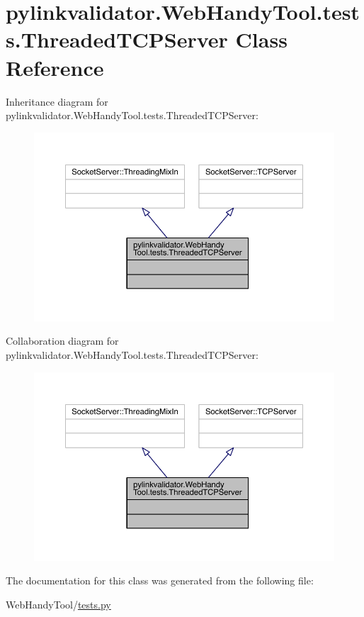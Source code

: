 \hypertarget{classpylinkvalidator_1_1_web_handy_tool_1_1tests_1_1_threaded_t_c_p_server}{}\section{pylinkvalidator.\+Web\+Handy\+Tool.\+tests.\+Threaded\+T\+C\+P\+Server Class Reference}
\label{classpylinkvalidator_1_1_web_handy_tool_1_1tests_1_1_threaded_t_c_p_server}


Inheritance diagram for pylinkvalidator.\+Web\+Handy\+Tool.\+tests.\+Threaded\+T\+C\+P\+Server\+:
\nopagebreak
\begin{figure}[H]
\begin{center}
\leavevmode
\includegraphics[width=350pt]{classpylinkvalidator_1_1_web_handy_tool_1_1tests_1_1_threaded_t_c_p_server__inherit__graph}
\end{center}
\end{figure}


Collaboration diagram for pylinkvalidator.\+Web\+Handy\+Tool.\+tests.\+Threaded\+T\+C\+P\+Server\+:
\nopagebreak
\begin{figure}[H]
\begin{center}
\leavevmode
\includegraphics[width=350pt]{classpylinkvalidator_1_1_web_handy_tool_1_1tests_1_1_threaded_t_c_p_server__coll__graph}
\end{center}
\end{figure}


The documentation for this class was generated from the following file\+:\begin{DoxyCompactItemize}
\item 
Web\+Handy\+Tool/\hyperlink{tests_8py}{tests.\+py}\end{DoxyCompactItemize}
